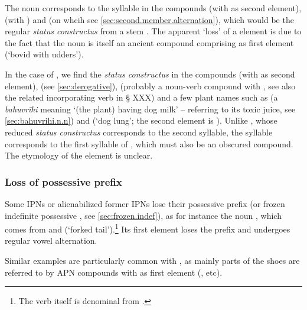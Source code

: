 The noun  corresponds to the syllable  in the compounds  (with  as second element),  (with ) and  (on whcih see \ref{sec:second.member.alternation}), which would be the regular \textit{status constructus} from a stem . The apparent `loss' of a  element is due to the fact that the noun  is itself an ancient compound comprising  as first element (`bovid with udders').

In the case of , we find the \textit{status constructus}  in the compounds  (with  as second element),  (see \ref{sec:derogative}),  (probably a noun-verb compound with , see also the related incorporating verb in § XXX) and a few plant names such as  (a \textit{bahuvrīhi} meaning `(the plant) having dog milk' -- referring to its toxic juice, see \ref{sec:bahuvrihi.n.n}) and  (`dog lung'; the second element is ). Unlike  , whose reduced \textit{status constructus} corresponds to the second syllable, the syllable  corresponds to the first syllable of , which must also be an obscured compound. The etymology of  the element  is unclear.

\subsubsection{Loss of possessive prefix} \label{sec:loss.possessive.prefix.compounds}
Some IPNs or alienabilized former IPNs lose their possessive prefix (or frozen indefinite possessive , see \ref{sec:frozen.indef}), as for instance the noun  , which comes from  and  (`forked tail').\footnote{The verb  itself is denominal from .} Its first element  loses the prefix  and undergoes regular vowel alternation.

Similar examples are particularly common with , as mainly parts of the shoes are referred to by APN compounds with  as first element (,  etc).

